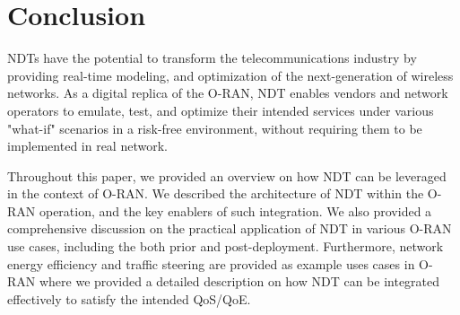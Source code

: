 \documentclass[]{IEEEtran}
\begin{document}
	
	\section{Conclusion} \label{sec:conclusion}
	NDTs have the potential to transform the telecommunications industry by providing real-time modeling, and optimization of the next-generation of wireless networks. As a digital replica of the O-RAN, NDT enables vendors and network operators to emulate, test, and optimize their intended services under various "what-if" scenarios in a risk-free environment, without requiring them to be implemented in real network. 
	
	Throughout this paper, we provided an overview on how NDT can be leveraged in the context of O-RAN. We described the architecture of NDT within the O-RAN operation, and the key enablers of such integration. We also provided a comprehensive discussion on the practical application of NDT in various O-RAN use cases, including the both prior and post-deployment. Furthermore, network energy efficiency and traffic steering are provided as example uses cases in O-RAN where we provided a detailed description on how NDT can be integrated effectively to satisfy the intended QoS/QoE.	
	
	
	  
	

	\vfill
	
\end{document}
